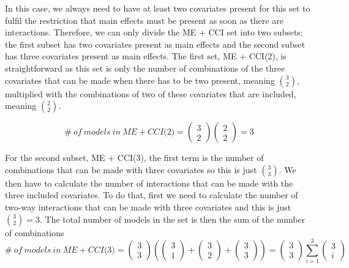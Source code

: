 In this case, we always need to have at least two covariates present for this set to fulfil the restriction that main effects must be present as soon as there are interactions. Therefore, we can only divide the ME + CCI set into two subsets; the first subset has two covariates present as main effects and the second subset has three covariates present as main effects. The first set, ME + CCI(2), is straightforward as this set is only the number of combinations of the three covariates that can be made when there has to be two present, meaning $\binom{3}{2}$, multiplied with the combinations of two of these covariates that are included, meaning $\binom{2}{2}$.

\noindent 
\[\#\ of\ models\ in\ ME + CCI\textit{(2)} =\left( \begin{array}{c}
3 \\ 
2 \end{array}
\right)\left( \begin{array}{c}
2 \\ 
2 \end{array}
\right)=3\] 

For the second subset, ME + CCI(3), the first term is the number of combinations that can be made with three covariates so this is just $\binom{3}{3}$. We then have to calculate the number of interactions that can be made with the three included covariates. To do that, first we need to calculate the number of two-way interactions that can be made with three covariates and this is just $\binom{3}{2}=3$. The total number of models in the set is then the sum of the number of combinations
\[\#\ of\ models\ in\ ME + CCI\textit{(3)}=\left( \begin{array}{c}
3 \\ 
3 \end{array}
\right)\left(\left( \begin{array}{c}
3 \\ 
1 \end{array}
\right)+\left( \begin{array}{c}
3 \\ 
2 \end{array}
\right)+\left( \begin{array}{c}
3 \\ 
3 \end{array}
\right)\right)=\left( \begin{array}{c}
3 \\ 
3 \end{array}
\right)\sum^3_{i=1}{\left( \begin{array}{c}
3 \\ 
i \end{array}
\right)}\] 

